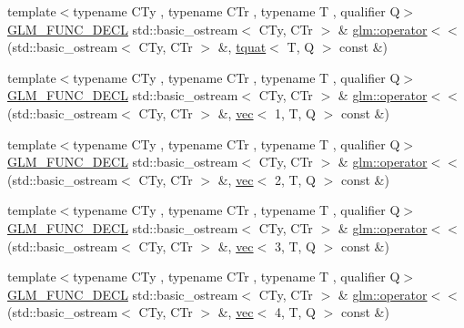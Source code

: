 \begin{DoxyCompactItemize}
\item 
{\footnotesize template$<$typename C\+Ty , typename C\+Tr , typename T , qualifier Q$>$ }\\\mbox{\hyperlink{setup_8hpp_ab2d052de21a70539923e9bcbf6e83a51}{G\+L\+M\+\_\+\+F\+U\+N\+C\+\_\+\+D\+E\+CL}} std\+::basic\+\_\+ostream$<$ C\+Ty, C\+Tr $>$ \& \mbox{\hyperlink{group__gtx__io_ga0d49970be1b7cdc10a2b027cea97c7e3}{glm\+::operator$<$$<$}} (std\+::basic\+\_\+ostream$<$ C\+Ty, C\+Tr $>$ \&, \mbox{\hyperlink{structglm_1_1tquat}{tquat}}$<$ T, Q $>$ const \&)
\item 
{\footnotesize template$<$typename C\+Ty , typename C\+Tr , typename T , qualifier Q$>$ }\\\mbox{\hyperlink{setup_8hpp_ab2d052de21a70539923e9bcbf6e83a51}{G\+L\+M\+\_\+\+F\+U\+N\+C\+\_\+\+D\+E\+CL}} std\+::basic\+\_\+ostream$<$ C\+Ty, C\+Tr $>$ \& \mbox{\hyperlink{group__gtx__io_ga7a029530f08d465cd95b60186c625aba}{glm\+::operator$<$$<$}} (std\+::basic\+\_\+ostream$<$ C\+Ty, C\+Tr $>$ \&, \mbox{\hyperlink{structglm_1_1vec}{vec}}$<$ 1, T, Q $>$ const \&)
\item 
{\footnotesize template$<$typename C\+Ty , typename C\+Tr , typename T , qualifier Q$>$ }\\\mbox{\hyperlink{setup_8hpp_ab2d052de21a70539923e9bcbf6e83a51}{G\+L\+M\+\_\+\+F\+U\+N\+C\+\_\+\+D\+E\+CL}} std\+::basic\+\_\+ostream$<$ C\+Ty, C\+Tr $>$ \& \mbox{\hyperlink{group__gtx__io_ga164ed8df8315066e091df1987617f188}{glm\+::operator$<$$<$}} (std\+::basic\+\_\+ostream$<$ C\+Ty, C\+Tr $>$ \&, \mbox{\hyperlink{structglm_1_1vec}{vec}}$<$ 2, T, Q $>$ const \&)
\item 
{\footnotesize template$<$typename C\+Ty , typename C\+Tr , typename T , qualifier Q$>$ }\\\mbox{\hyperlink{setup_8hpp_ab2d052de21a70539923e9bcbf6e83a51}{G\+L\+M\+\_\+\+F\+U\+N\+C\+\_\+\+D\+E\+CL}} std\+::basic\+\_\+ostream$<$ C\+Ty, C\+Tr $>$ \& \mbox{\hyperlink{group__gtx__io_ga367fccf3eb4c54a7624e628b6131e76d}{glm\+::operator$<$$<$}} (std\+::basic\+\_\+ostream$<$ C\+Ty, C\+Tr $>$ \&, \mbox{\hyperlink{structglm_1_1vec}{vec}}$<$ 3, T, Q $>$ const \&)
\item 
{\footnotesize template$<$typename C\+Ty , typename C\+Tr , typename T , qualifier Q$>$ }\\\mbox{\hyperlink{setup_8hpp_ab2d052de21a70539923e9bcbf6e83a51}{G\+L\+M\+\_\+\+F\+U\+N\+C\+\_\+\+D\+E\+CL}} std\+::basic\+\_\+ostream$<$ C\+Ty, C\+Tr $>$ \& \mbox{\hyperlink{group__gtx__io_ga6ce60b96203d549182f4df029007fb94}{glm\+::operator$<$$<$}} (std\+::basic\+\_\+ostream$<$ C\+Ty, C\+Tr $>$ \&, \mbox{\hyperlink{structglm_1_1vec}{vec}}$<$ 4, T, Q $>$ const \&)

\end{DoxyCompactItemize}
